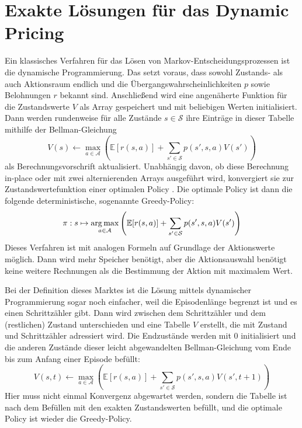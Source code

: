 \section{Exakte Lösungen für das Dynamic Pricing}
\label{section:dp}
Ein klassisches Verfahren für das Lösen von Markov-Entscheidungsprozessen ist die dynamische Programmierung.
Das setzt voraus, dass sowohl Zustands- als auch Aktionsraum endlich und die Übergangswahrscheinlichkeiten $p$ sowie Belohnungen $r$ bekannt sind.
Anschließend wird eine angenäherte Funktion für die Zustandswerte $V$ als Array gespeichert und mit beliebigen Werten initialisiert.
Dann werden rundenweise für alle Zustände $s\in\mathcal{S}$ ihre Einträge in dieser Tabelle mithilfe der Bellman-Gleichung
\begin{equation}
    V(s) \leftarrow \max_{a\in\mathcal{A}}{\left(\mathbb{E}[r(s, a)] + \sum_{s'\in\mathcal{S}}{p\left(s', s, a\right) V\left(s'\right)}\right)}
\end{equation}
als Berechnungsvorschrift aktualisiert.
Unabhängig davon, ob diese Berechnung in-place oder mit zwei alternierenden Arrays ausgeführt wird, konvergiert sie zur Zustandswertefunktion einer optimalen Policy \cite{Sutton1998}.
Die optimale Policy ist dann die folgende deterministische, sogenannte Greedy-Policy:
\begin{equation}
    \pi: s \mapsto \argmax_{a\in\mathcal{A}}{\left(\mathbb{E}[r(s, a)] + \sum_{s'\in\mathcal{S}}{p\left(s', s, a\right) V\left(s'\right)}\right)}
\end{equation}
Dieses Verfahren ist mit analogen Formeln auf Grundlage der Aktionswerte möglich.
Dann wird mehr Speicher benötigt, aber die Aktionsauswahl benötigt keine weitere Rechnungen als die Bestimmung der Aktion mit maximalem Wert.

Bei der Definition dieses Marktes ist die Lösung mittels dynamischer Programmierung sogar noch einfacher, weil die Episodenlänge begrenzt ist und es einen Schrittzähler gibt.
Dann wird zwischen dem Schrittzähler und dem (restlichen) Zustand unterschieden und eine Tabelle $V$ erstellt, die mit Zustand und Schrittzähler adressiert wird.
Die Endzustände werden mit $0$ initialisiert und die anderen Zustände dieser leicht abgewandelten Bellman-Gleichung vom Ende bis zum Anfang einer Episode befüllt:
\begin{equation}
    V(s, t) \leftarrow \max_{a\in\mathcal{A}}{\left(\mathbb{E}[r(s, a)] + \sum_{s'\in\mathcal{S}}{p\left(s', s, a\right) V\left(s', t+1\right)}\right)}
\end{equation}
Hier muss nicht einmal Konvergenz abgewartet werden, sondern die Tabelle ist nach dem Befüllen mit den exakten Zustandswerten befüllt, und die optimale Policy ist wieder die Greedy-Policy.

